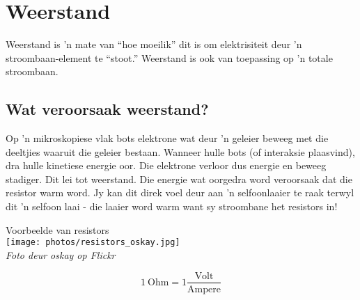 \section{Weerstand}

Weerstand is 'n mate van ``hoe moeilik'' dit is om elektrisiteit deur 'n
stroombaan-element te ``stoot.'' Weerstand is ook van toepassing op 'n totale
stroombaan.
\subsection*{Wat veroorsaak weerstand?}

\begin{minipage}{.5\textwidth}
Op 'n mikroskopiese vlak bots elektrone wat deur 'n geleier beweeg met die
deeltjies waaruit die geleier bestaan. Wanneer hulle bots (of interaksie
plaasvind), dra hulle kinetiese energie oor. Die elektrone verloor dus energie
en beweeg stadiger. Dit lei tot weerstand. Die energie wat oorgedra word
veroorsaak dat die resistor warm word.
Jy kan dit direk voel deur aan 'n selfoonlaaier te raak terwyl dit 'n selfoon
laai - die laaier word warm want sy stroombane het resistors in!
\end{minipage}
\begin{minipage}{.5\textwidth}
\begin{center}
 Voorbeelde van resistors\\
\texttt{[image: photos/resistors\_oskay.jpg]}\\
\textit{Foto deur oskay op Flickr}
\end{center}
\end{minipage}

\begin{equation*}
1 \ \text{Ohm} = 1 \frac{\text{Volt}}{ \text{Ampere}}
\end{equation*}


